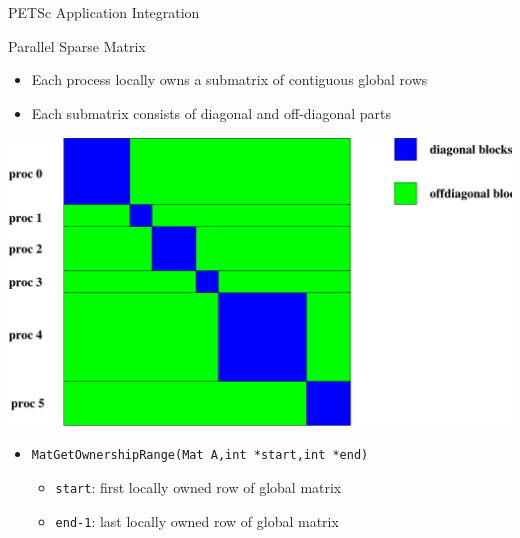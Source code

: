 \begin{frame}[fragile]{PETSc Application Integration}

\begin{block}{Parallel Sparse Matrix}
\begin{itemize}
  \item Each process locally owns a submatrix of contiguous global rows
  \item Each submatrix consists of diagonal and off-diagonal parts
\end{itemize}

\begin{center}
\includegraphics[width=3.in]{figures/Mat/parallelSparseMatrix}
\end{center}

\begin{itemize}
  \item \lstinline|MatGetOwnershipRange(Mat A,int *start,int *end)|
  \begin{itemize}
    \item \lstinline|start|: first locally owned row of global matrix
    \item \lstinline|end-1|: last locally owned row of global matrix
  \end{itemize}
\end{itemize}
\end{block}
\end{frame}


